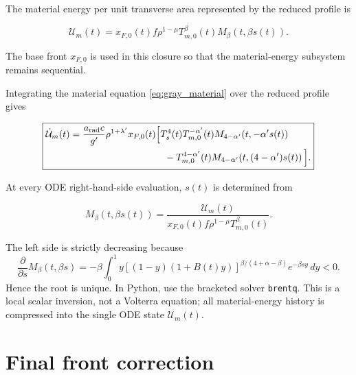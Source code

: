 \documentclass[11pt]{article}
\numberwithin{equation}{section}
\newcommand{\Ts}{T_s}
\newcommand{\Tm}{T_{m,0}}
\newcommand{\xfzero}{x_{F,0}}
\newcommand{\arad}{a_{\rm rad}}
\newcommand{\dif}{\,d}
\newcommand{\calU}{\mathcal{U}}
\begin{document}
The material energy per unit transverse area represented by the reduced
profile is
\begin{resultbox}
\begin{equation}
 \boxed{
 \calU_m(t)
 =\xfzero(t)f\rho^{1-\mu}\Tm^\beta(t)
 M_\beta\!\left(t,\beta s(t)\right).}
 \label{eq:Um_definition}
\end{equation}
\end{resultbox}
The base front $\xfzero$ is used in this closure so that the material-energy
subsystem remains sequential.

Integrating the material equation \eqref{eq:gray_material} over the reduced
profile gives
\begin{resultbox}
\begin{equation}
 \boxed{
 \begin{aligned}
 \dot{\calU}_m(t)
 ={}&\frac{\arad c}{g'}\rho^{1+\lambda'}\xfzero(t)
 \Big[
 \Ts^4(t)\Tm^{-\alpha'}(t)
 M_{4-\alpha'}\!\left(t,-\alpha's(t)\right)
 \\
 &\hspace{30mm}
 -\Tm^{4-\alpha'}(t)
 M_{4-\alpha'}\!\left(t,(4-\alpha')s(t)\right)
 \Big].
 \end{aligned}}
 \label{eq:Um_ode}
\end{equation}
\end{resultbox}
At every ODE right-hand-side evaluation, $s(t)$ is determined from
\begin{resultbox}
\begin{equation}
 \boxed{
 M_\beta\!\left(t,\beta s(t)\right)
 =\frac{\calU_m(t)}
 {\xfzero(t)f\rho^{1-\mu}\Tm^\beta(t)}.}
 \label{eq:s_root}
\end{equation}
\end{resultbox}
The left side is strictly decreasing because
\begin{equation}
 \frac{\partial}{\partial s}
 M_\beta(t,\beta s)
 =-\beta\int_0^1
 y\left[(1-y)(1+B(t)y)\right]^{\beta/(4+\alpha-\beta)}
 e^{-\beta s y}\dif y<0.
 \label{eq:s_monotone}
\end{equation}
Hence the root is unique.  In Python, use the bracketed solver
\texttt{brentq}.  This is a local scalar inversion, not a
Volterra equation; all material-energy history is compressed into the single
ODE state $\calU_m(t)$.

\section{Final front correction}
\end{document}
